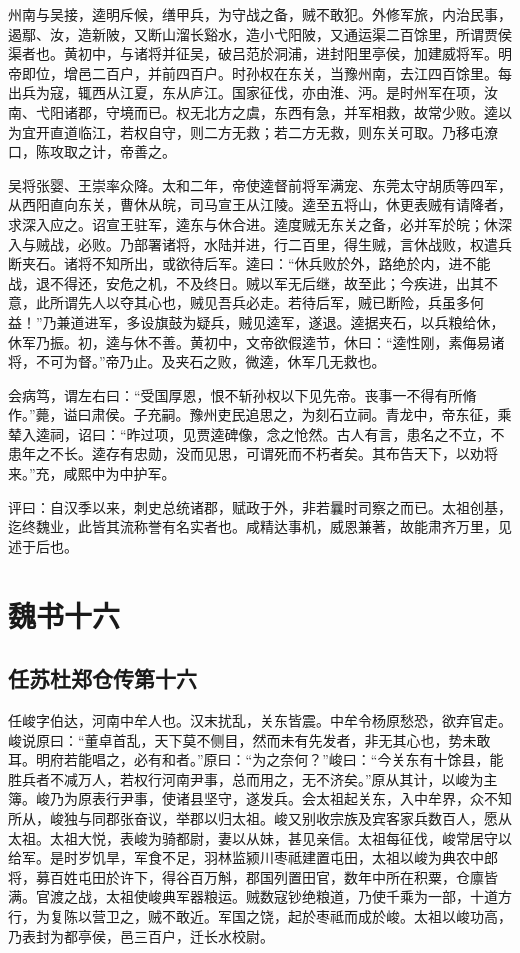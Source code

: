 \documentclass[12pt,UTF8]{ctexbook}
\begin{document}
州南与吴接，逵明斥候，缮甲兵，为守战之备，贼不敢犯。外修军旅，内治民事，遏鄢、汝，造新陂，又断山溜长谿水，造小弋阳陂，又通运渠二百馀里，所谓贾侯渠者也。黄初中，与诸将并征吴，破吕范於洞浦，进封阳里亭侯，加建威将军。明帝即位，增邑二百户，并前四百户。时孙权在东关，当豫州南，去江四百馀里。每出兵为寇，辄西从江夏，东从庐江。国家征伐，亦由淮、沔。是时州军在项，汝南、弋阳诸郡，守境而已。权无北方之虞，东西有急，并军相救，故常少败。逵以为宜开直道临江，若权自守，则二方无救；若二方无救，则东关可取。乃移屯潦口，陈攻取之计，帝善之。

吴将张婴、王崇率众降。太和二年，帝使逵督前将军满宠、东莞太守胡质等四军，从西阳直向东关，曹休从皖，司马宣王从江陵。逵至五将山，休更表贼有请降者，求深入应之。诏宣王驻军，逵东与休合进。逵度贼无东关之备，必并军於皖；休深入与贼战，必败。乃部署诸将，水陆并进，行二百里，得生贼，言休战败，权遣兵断夹石。诸将不知所出，或欲待后军。逵曰：“休兵败於外，路绝於内，进不能战，退不得还，安危之机，不及终日。贼以军无后继，故至此；今疾进，出其不意，此所谓先人以夺其心也，贼见吾兵必走。若待后军，贼已断险，兵虽多何益！”乃兼道进军，多设旗鼓为疑兵，贼见逵军，遂退。逵据夹石，以兵粮给休，休军乃振。初，逵与休不善。黄初中，文帝欲假逵节，休曰：“逵性刚，素侮易诸将，不可为督。”帝乃止。及夹石之败，微逵，休军几无救也。

会病笃，谓左右曰：“受国厚恩，恨不斩孙权以下见先帝。丧事一不得有所脩作。”薨，谥曰肃侯。子充嗣。豫州吏民追思之，为刻石立祠。青龙中，帝东征，乘辇入逵祠，诏曰：“昨过项，见贾逵碑像，念之怆然。古人有言，患名之不立，不患年之不长。逵存有忠勋，没而见思，可谓死而不朽者矣。其布告天下，以劝将来。”充，咸熙中为中护军。

评曰：自汉季以来，刺史总统诸郡，赋政于外，非若曩时司察之而已。太祖创基，迄终魏业，此皆其流称誉有名实者也。咸精达事机，威恩兼著，故能肃齐万里，见述于后也。

\part{魏书十六}
\chapter{任苏杜郑仓传第十六}

任峻字伯达，河南中牟人也。汉末扰乱，关东皆震。中牟令杨原愁恐，欲弃官走。峻说原曰：“董卓首乱，天下莫不侧目，然而未有先发者，非无其心也，势未敢耳。明府若能唱之，必有和者。”原曰：“为之奈何？”峻曰：“今关东有十馀县，能胜兵者不减万人，若权行河南尹事，总而用之，无不济矣。”原从其计，以峻为主簿。峻乃为原表行尹事，使诸县坚守，遂发兵。会太祖起关东，入中牟界，众不知所从，峻独与同郡张奋议，举郡以归太祖。峻又别收宗族及宾客家兵数百人，愿从太祖。太祖大悦，表峻为骑都尉，妻以从妹，甚见亲信。太祖每征伐，峻常居守以给军。是时岁饥旱，军食不足，羽林监颍川枣祗建置屯田，太祖以峻为典农中郎将，募百姓屯田於许下，得谷百万斛，郡国列置田官，数年中所在积粟，仓廪皆满。官渡之战，太祖使峻典军器粮运。贼数寇钞绝粮道，乃使千乘为一部，十道方行，为复陈以营卫之，贼不敢近。军国之饶，起於枣祗而成於峻。太祖以峻功高，乃表封为都亭侯，邑三百户，迁长水校尉。
\end{document}
